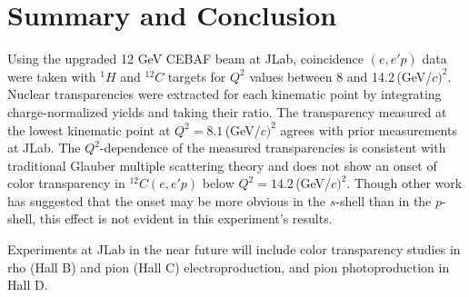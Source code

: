 \chapter{Summary and Conclusion}
Using the upgraded 12\,\,GeV CEBAF beam at JLab, coincidence $(e,e'p)$ data
were taken with $^{1}H$ and $^{12}C$ targets for $Q^2$ values between 8 and
14.2\,(GeV/$c)^2$.
Nuclear transparencies were extracted for each kinematic point by integrating
charge-normalized yields and taking their ratio.
The transparency measured at the lowest kinematic point at
$Q^2=8.1$\,(GeV/$c)^2$ agrees with prior measurements at JLab.
The $Q^2$-dependence of the measured transparencies is consistent with
traditional Glauber multiple scattering theory and does not show an onset of
color transparency in $^{12}C(e,e'p)$ below $Q^2=14.2$\,(GeV/$c)^2$.
Though other work has suggested that the onset may be more obvious in the
$s$-shell than in the $p$-shell, this effect is not evident in this
experiment's results.

Experiments at JLab in the near future will include color transparency studies
in rho (Hall B) and pion (Hall C) electroproduction, and pion photoproduction
in Hall D.

